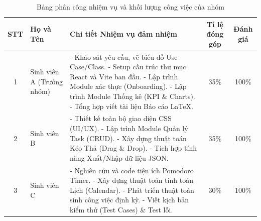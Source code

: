 \begin{table}[H]
    \centering
    \renewcommand{\arraystretch}{1.5}
    \begin{tabular}{|c|p{3.5cm}|p{6cm}|c|c|}
        \hline
        \textbf{STT} & \textbf{Họ và Tên} & \textbf{Chi tiết Nhiệm vụ đảm nhiệm} & \textbf{Tỉ lệ đóng góp} & \textbf{Đánh giá} \\
        \hline
        1 & Sinh viên A \newline (Trưởng nhóm) & 
        - Khảo sát yêu cầu, vẽ biểu đồ Use Case/Class. \newline
        - Setup cấu trúc thư mục React và Vite ban đầu. \newline
        - Lập trình Module xác thực (Onboarding). \newline
        - Lập trình Module Thống kê (KPI \& Charts). \newline
        - Tổng hợp viết tài liệu Báo cáo LaTeX. & 35\% & 100\% \\
        \hline
        2 & Sinh viên B & 
        - Thiết kế toàn bộ giao diện CSS (UI/UX). \newline
        - Lập trình Module Quản lý Task (CRUD). \newline
        - Xây dựng thuật toán Kéo Thả (Drag \& Drop). \newline
        - Tích hợp tính năng Xuất/Nhập dữ liệu JSON. & 35\% & 100\% \\
        \hline
        3 & Sinh viên C & 
        - Nghiên cứu và code tiện ích Pomodoro Timer. \newline
        - Xây dựng thuật toán tính toán Lịch (Calendar). \newline
        - Phát triển thuật toán sinh công việc định kỳ. \newline
        - Viết kịch bản kiểm thử (Test Cases) \& Test lỗi. & 30\% & 100\% \\
        \hline
    \end{tabular}
    \caption{Bảng phân công nhiệm vụ và khối lượng công việc của nhóm}
\end{table}
